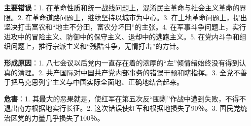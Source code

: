 \textbf{主要错误}：1.
在革命性质和统一战线问题上，混淆民主革命与社会主义革命的界限。2.
在革命道路问题上，继续坚持以城市为中心。3.
在土地革命问题上，提出坚决打击富农和``地主不分田，富农分坏田''的主张。4.
在军事斗争问题上，实行进攻中的冒险主义、防御中的保守主义、退却中的逃跑主义。5.
在党内斗争和组织问题上，推行宗派主义和``残酷斗争，无情打击''的方针。

\textbf{形成原因}{：1.
八七会议以后党内一直存在着的浓厚的``左''倾情绪始终没有得到认真的清理。2.
共产国际对中国共产党内部事务的错误干预和瞎指挥。3.
全党不善于把马克思列宁主义与中国实际全面地、正确地结合起来。}

\textbf{危害}{：1.
其最大的恶果就是，使红军在第五次反``围剿''作战中遭到失败，不得不退出南方根据地实行长征。2.
这次错误使红军和根据地损失了90％。3.
国民党统治区党的力量几乎损失了100％。}
